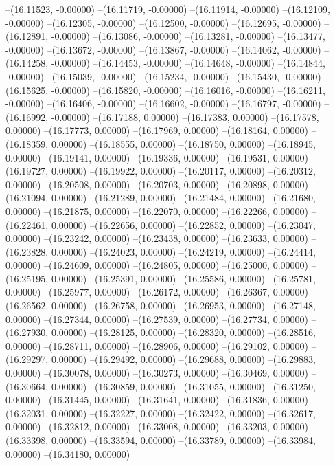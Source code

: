 --(16.11523, -0.00000)
--(16.11719, -0.00000)
--(16.11914, -0.00000)
--(16.12109, -0.00000)
--(16.12305, -0.00000)
--(16.12500, -0.00000)
--(16.12695, -0.00000)
--(16.12891, -0.00000)
--(16.13086, -0.00000)
--(16.13281, -0.00000)
--(16.13477, -0.00000)
--(16.13672, -0.00000)
--(16.13867, -0.00000)
--(16.14062, -0.00000)
--(16.14258, -0.00000)
--(16.14453, -0.00000)
--(16.14648, -0.00000)
--(16.14844, -0.00000)
--(16.15039, -0.00000)
--(16.15234, -0.00000)
--(16.15430, -0.00000)
--(16.15625, -0.00000)
--(16.15820, -0.00000)
--(16.16016, -0.00000)
--(16.16211, -0.00000)
--(16.16406, -0.00000)
--(16.16602, -0.00000)
--(16.16797, -0.00000)
--(16.16992, -0.00000)
--(16.17188, 0.00000)
--(16.17383, 0.00000)
--(16.17578, 0.00000)
--(16.17773, 0.00000)
--(16.17969, 0.00000)
--(16.18164, 0.00000)
--(16.18359, 0.00000)
--(16.18555, 0.00000)
--(16.18750, 0.00000)
--(16.18945, 0.00000)
--(16.19141, 0.00000)
--(16.19336, 0.00000)
--(16.19531, 0.00000)
--(16.19727, 0.00000)
--(16.19922, 0.00000)
--(16.20117, 0.00000)
--(16.20312, 0.00000)
--(16.20508, 0.00000)
--(16.20703, 0.00000)
--(16.20898, 0.00000)
--(16.21094, 0.00000)
--(16.21289, 0.00000)
--(16.21484, 0.00000)
--(16.21680, 0.00000)
--(16.21875, 0.00000)
--(16.22070, 0.00000)
--(16.22266, 0.00000)
--(16.22461, 0.00000)
--(16.22656, 0.00000)
--(16.22852, 0.00000)
--(16.23047, 0.00000)
--(16.23242, 0.00000)
--(16.23438, 0.00000)
--(16.23633, 0.00000)
--(16.23828, 0.00000)
--(16.24023, 0.00000)
--(16.24219, 0.00000)
--(16.24414, 0.00000)
--(16.24609, 0.00000)
--(16.24805, 0.00000)
--(16.25000, 0.00000)
--(16.25195, 0.00000)
--(16.25391, 0.00000)
--(16.25586, 0.00000)
--(16.25781, 0.00000)
--(16.25977, 0.00000)
--(16.26172, 0.00000)
--(16.26367, 0.00000)
--(16.26562, 0.00000)
--(16.26758, 0.00000)
--(16.26953, 0.00000)
--(16.27148, 0.00000)
--(16.27344, 0.00000)
--(16.27539, 0.00000)
--(16.27734, 0.00000)
--(16.27930, 0.00000)
--(16.28125, 0.00000)
--(16.28320, 0.00000)
--(16.28516, 0.00000)
--(16.28711, 0.00000)
--(16.28906, 0.00000)
--(16.29102, 0.00000)
--(16.29297, 0.00000)
--(16.29492, 0.00000)
--(16.29688, 0.00000)
--(16.29883, 0.00000)
--(16.30078, 0.00000)
--(16.30273, 0.00000)
--(16.30469, 0.00000)
--(16.30664, 0.00000)
--(16.30859, 0.00000)
--(16.31055, 0.00000)
--(16.31250, 0.00000)
--(16.31445, 0.00000)
--(16.31641, 0.00000)
--(16.31836, 0.00000)
--(16.32031, 0.00000)
--(16.32227, 0.00000)
--(16.32422, 0.00000)
--(16.32617, 0.00000)
--(16.32812, 0.00000)
--(16.33008, 0.00000)
--(16.33203, 0.00000)
--(16.33398, 0.00000)
--(16.33594, 0.00000)
--(16.33789, 0.00000)
--(16.33984, 0.00000)
--(16.34180, 0.00000)
